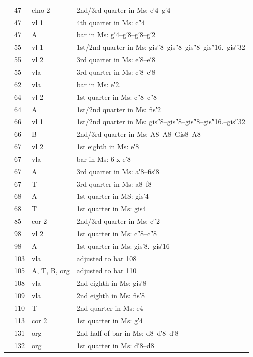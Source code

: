 \documentclass[parskip=full]{scrreprt}
\begin{document}
\begin{longtable}{lll L{10cm}}
	  & 47   & clno 2  & 2nd/3rd quarter in Ms: e′4–g′4 \\
	  & 47   & vl 1    & 4th quarter in Ms: c″4 \\
	  & 47   & A       & bar in Ms: g′4–g′8–g′8–g′2 \\
	  & 55   & vl 1    & 1st/2nd quarter in Ms: gis″8–gis″8–gis″8–gis″16.–gis″32 \\
	  & 55   & vl 2    & 3rd quarter in Ms: e′8–e′8 \\
	  & 55   & vla     & 3rd quarter in Ms: c′8–c′8 \\
	  & 62   & vla     & bar in Ms: e′2. \\
	  & 64   & vl 2    & 1st quarter in Ms: c″8–c″8 \\
	  & 64   & A       & 1st/2nd quarter in Ms: fis′2 \\
	  & 66   & vl 1    & 1st/2nd quarter in Ms: gis″8–gis″8–gis″8–gis″16.–gis″32 \\
	  & 66   & B       & 2nd/3rd quarter in Ms: A8–A8–Gis8–A8 \\
	  & 67   & vl 2    & 1st eighth in Ms: e′8 \\
	  & 67   & vla     & bar in Ms: 6 x e′8 \\
	  & 67   & A       & 3rd quarter in Ms: a′8–fis′8 \\
	  & 67   & T       & 3rd quarter in Ms: a8–f8 \\
	  & 68   & A       & 1st quarter in MS: gis′4 \\
	  & 68   & T       & 1st quarter in Ms: gis4 \\
	  & 85   & cor 2   & 2nd/3rd quarter in Ms: c″2 \\
	  & 98   & vl 2    & 1st quarter in Ms: c″8–c″8 \\
	  & 98   & A       & 1st quarter in Ms: gis′8.–gis′16 \\
	  & 103  & vla     & adjusted to bar 108 \\
	  & 105  & A, T, B, org & adjusted to bar 110 \\
	  & 108  & vla     & 2nd eighth in Ms: gis′8 \\
	  & 109  & vla     & 2nd eighth in Ms: fis′8 \\
	  & 110  & T       & 2nd quarter in Ms: e4 \\
	  & 113  & cor 2   & 1st quarter in Ms: g′4 \\
	  & 131  & org     & 2nd half of bar in Ms: d8–d′8–d′8 \\
	  & 132  & org     & 1st quarter in Ms: d′8–d8 \\

\end{longtable}
\end{document}
